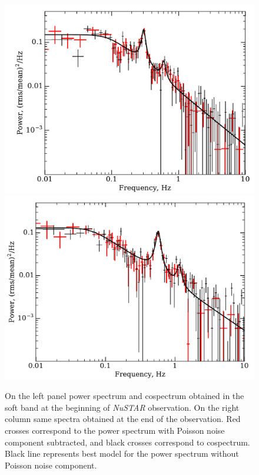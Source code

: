 \documentclass[a4paper,fleqn,usenatbib]{mnras}
\begin{document}
\begin{figure}
        \includegraphics[trim=0 0 0 0.65cm, clip, width=\columnwidth]{spectrum_model_and_cospectrum0.pdf}
        \includegraphics[width=\columnwidth, height = 0.83\columnwidth]{spectrum_model_and_cospectrum10.pdf}
        \caption{On the left panel power spectrum and cospectrum obtained in the soft band at the beginning of {\it NuSTAR} observation. 
        On the right column same spectra obtained at the end of the observation.
        Red crosses correspond to the power spectrum with Poisson noise component subtracted, and black crosses correspond to cospectrum.
        Black line represents best model for the power spectrum without Poisson noise component.}
        \label{fig:qpo}
\end{figure}
\end{document}
